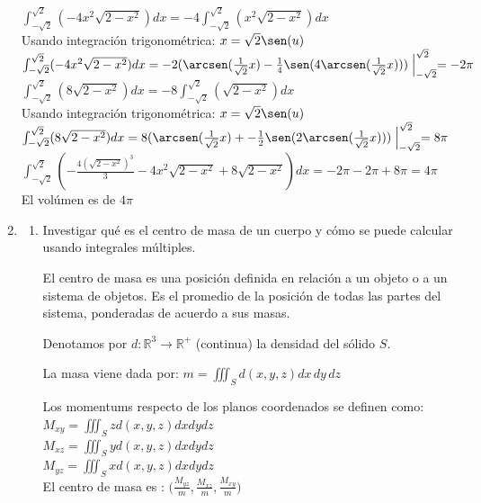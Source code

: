 \documentclass{article}
\begin{document}
\begin{enumerate}
{        $\int_{-\sqrt{2}}^{\sqrt{2}}(-4x^2\sqrt{2-x^2})dx = -4\int_{-\sqrt{2}}^{\sqrt{2}}(x^2\sqrt{2-x^2})dx$\\
        Usando integración trigonométrica: $x = \sqrt{2}\sen(u)$\\
        $\int_{-\sqrt{2}}^{\sqrt{2}}(-4x^2\sqrt{2-x^2})dx = -2(\arcsen(\frac{1}{\sqrt{2}}x) - \frac{1}{4}\sen(4\arcsen(\frac{1}{\sqrt{2}}x)))\Bigm|_{-\sqrt{2}}^{\sqrt{2}} = -2\pi$\\

        $\int_{-\sqrt{2}}^{\sqrt{2}}(8\sqrt{2-x^2})dx = -8\int_{-\sqrt{2}}^{\sqrt{2}}(\sqrt{2-x^2})dx$\\
        Usando integración trigonométrica: $x = \sqrt{2}\sen(u)$\\
        $\int_{-\sqrt{2}}^{\sqrt{2}}(8\sqrt{2-x^2})dx = 8(\arcsen(\frac{1}{\sqrt{2}}x)+- \frac{1}{2}\sen(2\arcsen(\frac{1}{\sqrt{2}}x)))\Bigm|_{-\sqrt{2}}^{\sqrt{2}} = 8\pi$\\
        $\int_{-\sqrt{2}}^{\sqrt{2}}(-\frac{4(\sqrt{2-x^2})^3}{3} -4x^2\sqrt{2-x^2} + 8\sqrt{2-x^2})dx = -2\pi -2\pi + 8\pi = 4\pi$\\
        El volúmen es de $4\pi$
    }

    \item {
        \begin{enumerate}
        \item{
            Investigar qué es el centro de masa de un cuerpo y cómo se puede calcular usando integrales múltiples.

            \color{azul}
            El centro de masa es una posición definida en relación a un objeto o a un sistema de objetos.
            Es el promedio de la posición de todas las partes del sistema, ponderadas de acuerdo a sus masas.

            Denotamos por $d : \mathbb{R}^3 \rightarrow \mathbb{R}^+$ (continua) la densidad del sólido $S$.

            La masa viene dada por:	$m = \iiint_S d(x,y,z)dx\,dy\,dz$

            Los momentums respecto de los planos coordenados se definen como:\\
            $M_{xy} = \iiint_S zd(x,y,z)dxdydz$\\
            $M_{xz} = \iiint_S yd(x,y,z)dxdydz$\\
            $M_{yz} = \iiint_S xd(x,y,z)dxdydz$\\

            El centro de masa es : $\Big(\frac{M_{yz}}{m},\frac{M_{xz}}{m},\frac{M_{xy}}{m} \Big)$

}
\end{enumerate}}
\end{enumerate}
\end{document}
